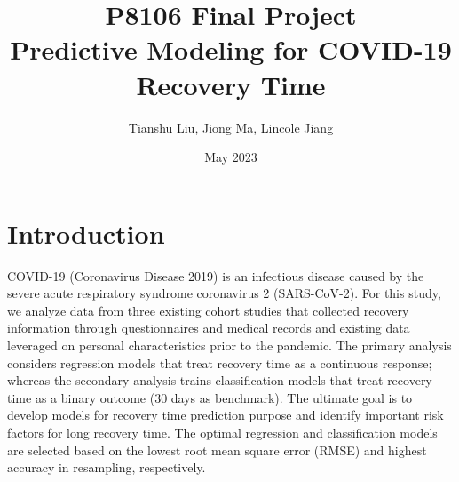 \documentclass[11pt]{article}
\title{P8106 Final Project \\ Predictive Modeling for COVID-19 Recovery Time}
\author{Tianshu Liu, Jiong Ma, Lincole Jiang}
\date{May 2023}
\begin{document}
\maketitle

\begin{center}
{\tableofcontents}
\end{center}

\setcounter{page}{0}
\newpage

\section{Introduction}

COVID-19 (Coronavirus Disease 2019) is an infectious disease caused by the severe acute respiratory syndrome coronavirus 2 (SARS-CoV-2). For this study, we analyze data from three existing cohort studies that collected recovery information through questionnaires and medical records and existing data leveraged on personal characteristics prior to the pandemic. The primary analysis considers regression models that treat recovery time as a continuous response; whereas the secondary analysis trains classification models that treat recovery time as a binary outcome (30 days as benchmark). The ultimate goal is to develop models for recovery time prediction purpose and identify important risk factors for long recovery time. The optimal regression and classification models are selected based on the lowest root mean square error (RMSE) and highest accuracy in resampling, respectively.

\end{document}
